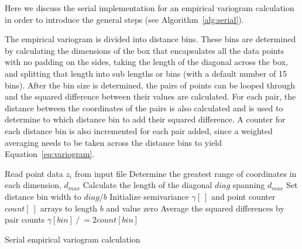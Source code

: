 
Here we discuss the serial implementation for an empirical variogram calculation in order to introduce the general steps (see Algorithm~\ref{alg:serial}). 

The empirical variogram is divided into distance bins. These bins are determined by calculating the dimensions of the box that encapsulates all the data points with no padding on the sides, taking the length of the diagonal across the box, and splitting that length into sub lengths or bins (with a default number of 15 bins). After the bin size is determined, the pairs of points can be looped through and the squared difference between their values are calculated. For each pair, the distance between the coordinates of the pairs is also calculated and is used to determine to which distance bin to add their squared difference. A counter for each distance bin is also incremented for each pair added, since a weighted averaging needs to be taken across the distance bins to yield Equation~\eqref{eq:variogram}.  

\begin{algorithm}[H]
 Read point data $z_i$ from input file\;
 Determine the greatest range of coordinates in each dimension, $d_{max}$\;
 Calculate the length of the diagonal $diag$ spanning $d_{max}$ \;
 Set distance bin width to $diag/b$\;
 Initialize semivariance $\gamma[~]$ and point counter $count[~]$ arrays to length $b$ and value zero\;
 Average the squared differences by pair counts $\gamma[bin]  \mathrel{/}= 2count[bin]$\;
 \caption{Serial empirical variogram calculation}
 \label{alg:serial}
\end{algorithm}
   
   